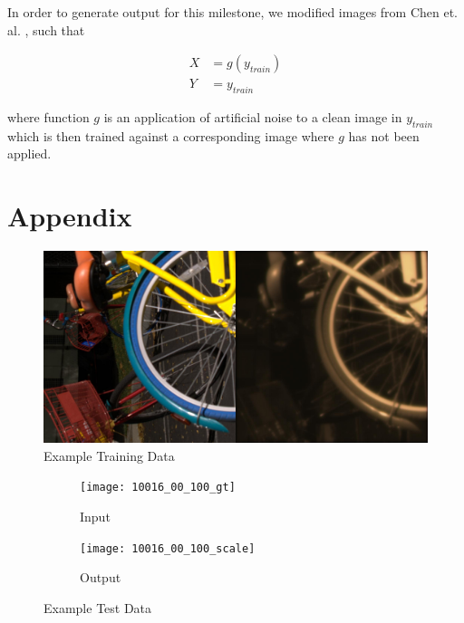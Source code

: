 \documentclass{article}
\begin{document}
In order to generate output for this milestone, we modified images from
Chen et. al. \cite{chen2018learning}, such that

\begin{align*}
  X &= g(y_{train})\\
  Y &= y_{train}
\end{align*}

where function $g$ is an application of artificial noise to a clean
image in $y_{train}$ which is then trained against a corresponding
image where $g$ has not been applied.


\section{Appendix}

\begin{figure}[ht]
  \centering
  \includegraphics[scale=0.1]{00002_00_train_100}
  \caption{ Example Training Data}
  \label{fig:train}
\end{figure}

\begin{figure}[ht]
  \centering
  \begin{subfigure}[t]{0.3\textwidth}
    \texttt{[image: 10016\_00\_100\_gt]}
    \caption{Input}
  \end{subfigure}
  \begin{subfigure}[t]{0.3\textwidth}
    \texttt{[image: 10016\_00\_100\_scale]}
    \caption{Output}
  \end{subfigure}
  \caption{ Example Test Data}
  \label{fig:test}
\end{figure}




\end{document}
